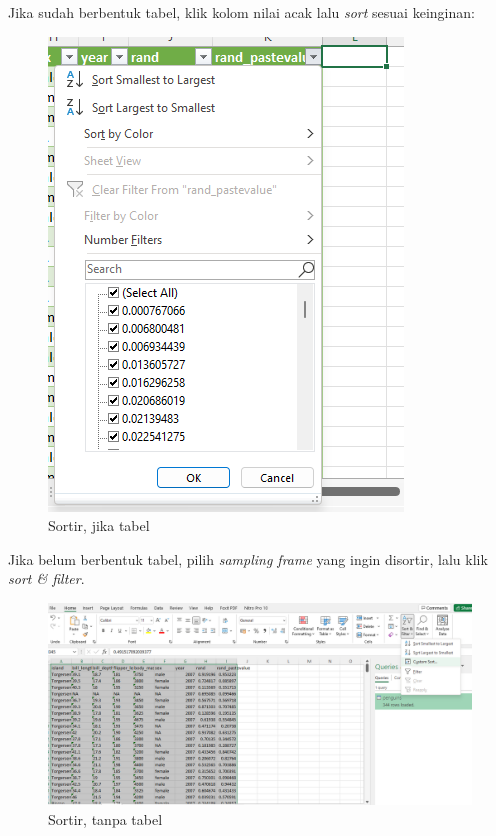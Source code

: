 \documentclass[
  letterpaper,
  DIV=11,
  numbers=noendperiod]{scrreprt}
\begin{document}
Jika sudah berbentuk tabel, klik kolom nilai acak lalu \emph{sort}
sesuai keinginan:

\begin{figure}

{\centering \includegraphics{./step3-sort1.png}

}

\caption{Sortir, jika tabel}

\end{figure}

Jika belum berbentuk tabel, pilih \emph{sampling frame} yang ingin
disortir, lalu klik \emph{sort \& filter}.

\begin{figure}

{\centering \includegraphics{./step-sort21.png}

}

\caption{Sortir, tanpa tabel}

\end{figure}
\end{document}
